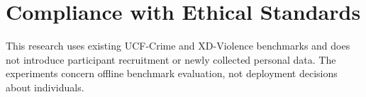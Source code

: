 \section{Compliance with Ethical Standards}
This research uses existing UCF-Crime and XD-Violence benchmarks and does not introduce participant recruitment or newly collected personal data. The experiments concern offline benchmark evaluation, not deployment decisions about individuals.
